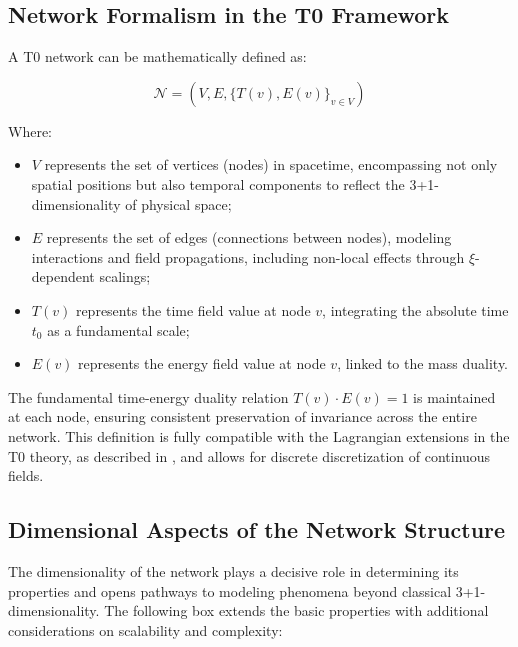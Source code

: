 	\subsection{Network Formalism in the T0 Framework}
	\label{subsec:network_formalism}
	
	A T0 network can be mathematically defined as:
	
	\begin{equation}
		\mathcal{N} = (V, E, \{T(v), E(v)\}_{v \in V})
	\end{equation}
	
	Where:
	\begin{itemize}
		\item $V$ represents the set of vertices (nodes) in spacetime, encompassing not only spatial positions but also temporal components to reflect the 3+1-dimensionality of physical space;
		\item $E$ represents the set of edges (connections between nodes), modeling interactions and field propagations, including non-local effects through $\xi$-dependent scalings;
		\item $T(v)$ represents the time field value at node $v$, integrating the absolute time $t_0$ as a fundamental scale;
		\item $E(v)$ represents the energy field value at node $v$, linked to the mass duality.
	\end{itemize}
	
	The fundamental time-energy duality relation $T(v) \cdot E(v) = 1$ is maintained at each node, ensuring consistent preservation of invariance across the entire network. This definition is fully compatible with the Lagrangian extensions in the T0 theory, as described in \cite{T0_tm_erweiterung}, and allows for discrete discretization of continuous fields.
	
	\subsection{Dimensional Aspects of the Network Structure}
	\label{subsec:dimensional_aspects}
	
	The dimensionality of the network plays a decisive role in determining its properties and opens pathways to modeling phenomena beyond classical 3+1-dimensionality. The following box extends the basic properties with additional considerations on scalability and complexity:
	
